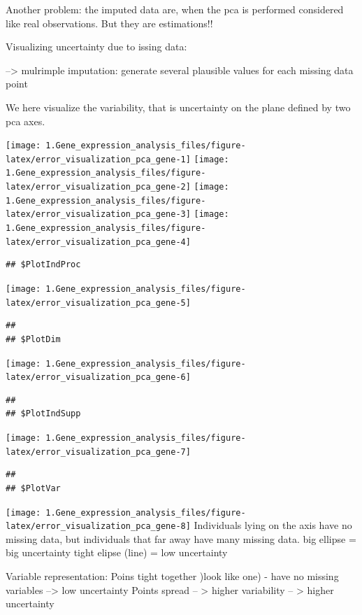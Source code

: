 \documentclass[
]{article}
\begin{document}
Another problem: the imputed data are, when the pca is performed
considered like real observations. But they are estimations!!

Visualizing uncertainty due to issing data:

--\textgreater{} mulrimple imputation: generate several plausible values
for each missing data point

We here visualize the variability, that is uncertainty on the plane
defined by two pca axes.

\texttt{[image: 1.Gene\_expression\_analysis\_files/figure-latex/error\_visualization\_pca\_gene-1]}
\texttt{[image: 1.Gene\_expression\_analysis\_files/figure-latex/error\_visualization\_pca\_gene-2]}
\texttt{[image: 1.Gene\_expression\_analysis\_files/figure-latex/error\_visualization\_pca\_gene-3]}
\texttt{[image: 1.Gene\_expression\_analysis\_files/figure-latex/error\_visualization\_pca\_gene-4]}

\begin{verbatim}
## $PlotIndProc
\end{verbatim}

\texttt{[image: 1.Gene\_expression\_analysis\_files/figure-latex/error\_visualization\_pca\_gene-5]}

\begin{verbatim}
## 
## $PlotDim
\end{verbatim}

\texttt{[image: 1.Gene\_expression\_analysis\_files/figure-latex/error\_visualization\_pca\_gene-6]}

\begin{verbatim}
## 
## $PlotIndSupp
\end{verbatim}

\texttt{[image: 1.Gene\_expression\_analysis\_files/figure-latex/error\_visualization\_pca\_gene-7]}

\begin{verbatim}
## 
## $PlotVar
\end{verbatim}

\texttt{[image: 1.Gene\_expression\_analysis\_files/figure-latex/error\_visualization\_pca\_gene-8]}
Individuals lying on the axis have no missing data, but individuals that
far away have many missing data. big ellipse = big uncertainty tight
elipse (line) = low uncertainty

Variable representation: Poins tight together )look like one) - have no
missing variables --\textgreater{} low uncertainty Points spread --
\textgreater{} higher variability -- \textgreater{} higher uncertainty
\end{document}
